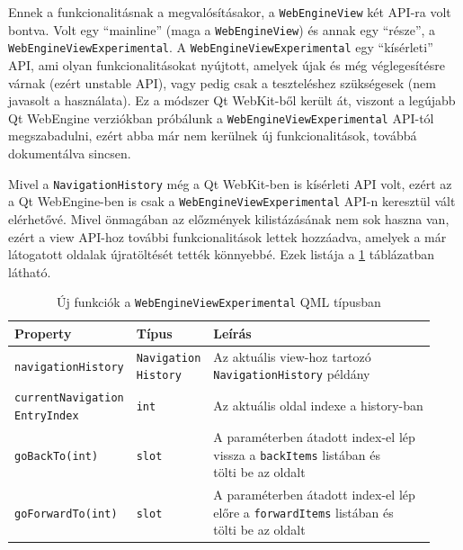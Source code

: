 \documentclass[12pt]{report}
\begin{document}
Ennek a funkcionalitásnak a megvalósításakor, a \texttt{WebEngineView} két API-ra volt
bontva. Volt egy ``mainline'' (maga a \texttt{WebEngineView}) és annak egy ``része'', a \\
\texttt{WebEngineViewExperimental}. A \texttt{WebEngineViewExperimental} egy ``kísérleti''
API, ami olyan funkcionalitásokat nyújtott, amelyek újak és még véglegesítésre várnak
(ezért unstable API), vagy pedig csak a teszteléshez szükségesek (nem javasolt a használata).
Ez a módszer Qt WebKit-ből került át, viszont a legújabb Qt WebEngine verziókban
próbálunk a \texttt{WebEngineViewExperimental} API-tól megszabadulni, ezért abba már nem
kerülnek új funkcionalitások, továbbá dokumentálva sincsen.

Mivel a \texttt{NavigationHistory} még a Qt WebKit-ben is kísérleti API volt, ezért az a
Qt WebEngine-ben is csak a \texttt{WebEngineViewExperimental} API-n keresztül vált
elérhetővé. Mivel önmagában az előzmények kilistázásának nem sok haszna van, ezért a view
API-hoz további funkcionalitások lettek hozzáadva, amelyek a már látogatott oldalak
újratöltését tették könnyebbé. Ezek listája a \ref{tab:navigation-history-experimental-api}
táblázatban látható.

\begin{table}[h!]
    \centering
    \begin{tabular}{ | l | l | p{194pt} | }
        \hline
        \textbf{Property} & \textbf{Típus} & \textbf{Leírás} \\ \hline

        \texttt{navigationHistory} & \makecell[l]{\texttt{Navigation} \\ \texttt{History}} &
        \makecell[l]{Az aktuális view-hoz tartozó \\ \texttt{NavigationHistory} példány}
        \\ \hline

        \makecell[l]{\texttt{currentNavigation} \\ \texttt{EntryIndex}} & \texttt{int} &
        Az aktuális oldal indexe a history-ban
        \\ \hline

        \texttt{goBackTo(int)} & \texttt{slot} &
        \makecell[l]{A paraméterben átadott index-el lép \\
                     vissza a \texttt{backItems} listában és \\
                     tölti be az oldalt}
        \\ \hline

        \texttt{goForwardTo(int)} & \texttt{slot} &
        \makecell[l]{A paraméterben átadott index-el lép \\
                     előre a \texttt{forwardItems} listában és \\
                     tölti be az oldalt}
        \\ \hline
    \end{tabular}
    \caption{
        \label{tab:navigation-history-experimental-api}
        Új funkciók a \texttt{WebEngineViewExperimental} QML típusban
    }
\end{table}
\end{document}

